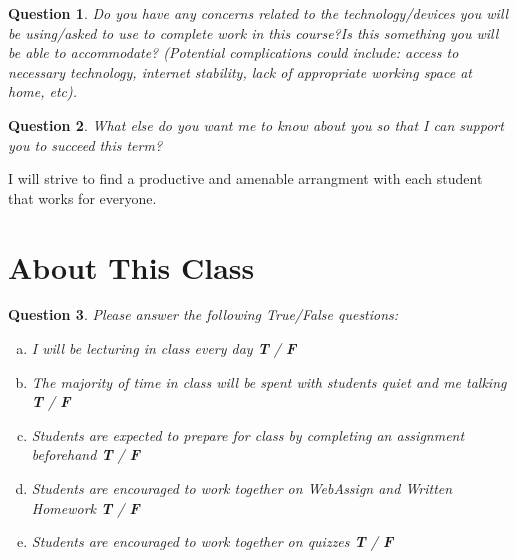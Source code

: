 \documentclass[11pt,reqno,final]{amsart}
\numberwithin{equation}{section}
\numberwithin{figure}{section}
\newtheorem{question}{Question}
\theoremstyle{definition} %
\begin{document}
\begin{question}
        Do you have any concerns related to the technology/devices you will be using/asked to use to complete work in this course?Is this something you will be able to accommodate?
        (Potential complications could include: access to necessary technology, internet stability, lack of appropriate working space at home, etc).
        \vfill
\end{question}

\begin{question}
        What else do you want me to know about you so that I can support you to succeed this term?
        \vfill
\end{question}

I will strive to find a productive and amenable arrangment with each student that works for everyone.


\section{About This Class}

\begin{question}
        Please answer the following True/False questions:
        \begin{enumerate}[(a)]
        \item I will be lecturing in class every day \qquad \textbf{T} \quad / \quad \textbf{F}\\
        \item The majority of time in class will be spent with students quiet and me talking \qquad \textbf{T} \quad / \quad \textbf{F}\\
        \item Students are expected to prepare for class by completing an assignment beforehand \qquad \textbf{T} \quad / \quad \textbf{F}\\
        \item Students are encouraged to work together on WebAssign and Written Homework \qquad \textbf{T} \quad / \quad \textbf{F}\\
        \item Students are encouraged to work together on quizzes \qquad \textbf{T} \quad / \quad \textbf{F}
        \end{enumerate}
\end{question}
\end{document}

